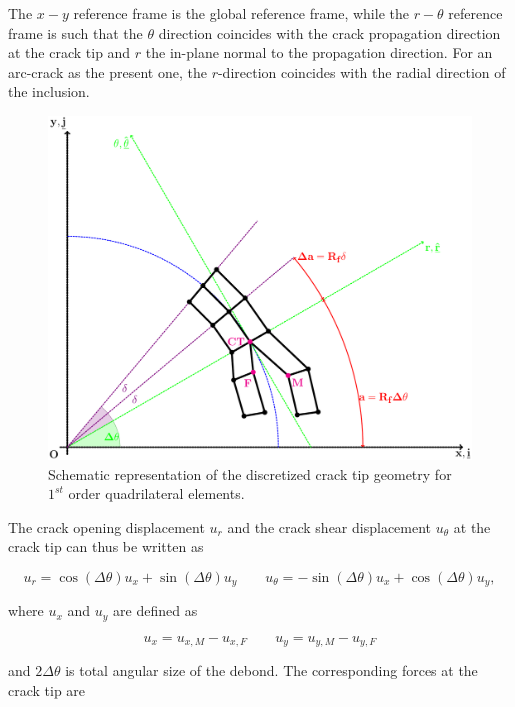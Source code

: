\documentclass[review]{elsarticle}
\begin{document}
The $x-y$ reference frame is the global reference frame, while the $r-\theta$ reference frame is such that the $\theta$ direction coincides with the crack propagation direction at the crack tip and $r$ the in-plane normal to the propagation direction. For an arc-crack as the present one, the $r$-direction coincides with the radial direction of the inclusion.

\begin{figure}[!h]
\includegraphics[width=\textwidth]{VCCT-linear-appendix.pdf}
\caption{Schematic representation of the discretized crack tip geometry for  $1^{st}$ order quadrilateral elements.}\label{fig:vcctlinearapp}
\end{figure}

The crack opening displacement $u_{r}$ and the crack shear displacement $u_{\theta}$ at the crack tip can thus be written as

\begin{equation}
u_{r}=\cos\left(\Delta\theta\right) u_{x}+\sin\left(\Delta\theta\right) u_{y}\qquad u_{\theta}=-\sin\left(\Delta\theta\right) u_{x}+\cos\left(\Delta\theta\right) u_{y},
\end{equation}

where $u_{x}$ and $u_{y}$ are defined as

\begin{equation}\label{eq:uxuy}
u_{x}=u_{x,M}-u_{x,F}\qquad u_{y}=u_{y,M}-u_{y,F}
\end{equation}

and $2\Delta\theta$ is total angular size of the debond. The corresponding forces at the crack tip are
\end{document}
